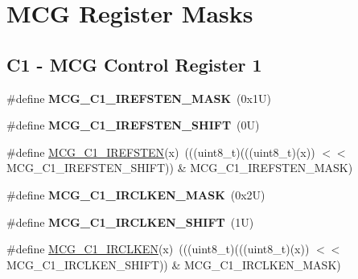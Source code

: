 \hypertarget{group___m_c_g___register___masks}{}\section{M\+CG Register Masks}
\label{group___m_c_g___register___masks}
\subsection*{C1 -\/ M\+CG Control Register 1}
\begin{DoxyCompactItemize}
\item 
\mbox{\label{group___m_c_g___register___masks_ga275f9145f8c55ff4c836cbd20ab06139}} 
\#define {\bfseries M\+C\+G\+\_\+\+C1\+\_\+\+I\+R\+E\+F\+S\+T\+E\+N\+\_\+\+M\+A\+SK}~(0x1\+U)
\item 
\mbox{\label{group___m_c_g___register___masks_ga10e0a80bfe715350aba6d5f5212617bc}} 
\#define {\bfseries M\+C\+G\+\_\+\+C1\+\_\+\+I\+R\+E\+F\+S\+T\+E\+N\+\_\+\+S\+H\+I\+FT}~(0\+U)
\item 
\#define \mbox{\hyperlink{group___m_c_g___register___masks_gae9002ca9879cd655f9e39f1829b40a03}{M\+C\+G\+\_\+\+C1\+\_\+\+I\+R\+E\+F\+S\+T\+EN}}(x)~(((uint8\+\_\+t)(((uint8\+\_\+t)(x)) $<$$<$ M\+C\+G\+\_\+\+C1\+\_\+\+I\+R\+E\+F\+S\+T\+E\+N\+\_\+\+S\+H\+I\+FT)) \& M\+C\+G\+\_\+\+C1\+\_\+\+I\+R\+E\+F\+S\+T\+E\+N\+\_\+\+M\+A\+SK)
\item 
\mbox{\label{group___m_c_g___register___masks_ga50398d9dc80a3016fddc6a2aef3df994}} 
\#define {\bfseries M\+C\+G\+\_\+\+C1\+\_\+\+I\+R\+C\+L\+K\+E\+N\+\_\+\+M\+A\+SK}~(0x2\+U)
\item 
\mbox{\label{group___m_c_g___register___masks_ga2c4305645e7c2b3977dcd0d35c7eaab9}} 
\#define {\bfseries M\+C\+G\+\_\+\+C1\+\_\+\+I\+R\+C\+L\+K\+E\+N\+\_\+\+S\+H\+I\+FT}~(1\+U)
\item 
\#define \mbox{\hyperlink{group___m_c_g___register___masks_ga9fc55b990e5876cb6fbeef0bf7caa040}{M\+C\+G\+\_\+\+C1\+\_\+\+I\+R\+C\+L\+K\+EN}}(x)~(((uint8\+\_\+t)(((uint8\+\_\+t)(x)) $<$$<$ M\+C\+G\+\_\+\+C1\+\_\+\+I\+R\+C\+L\+K\+E\+N\+\_\+\+S\+H\+I\+FT)) \& M\+C\+G\+\_\+\+C1\+\_\+\+I\+R\+C\+L\+K\+E\+N\+\_\+\+M\+A\+SK)
\item 

\end{DoxyCompactItemize}
